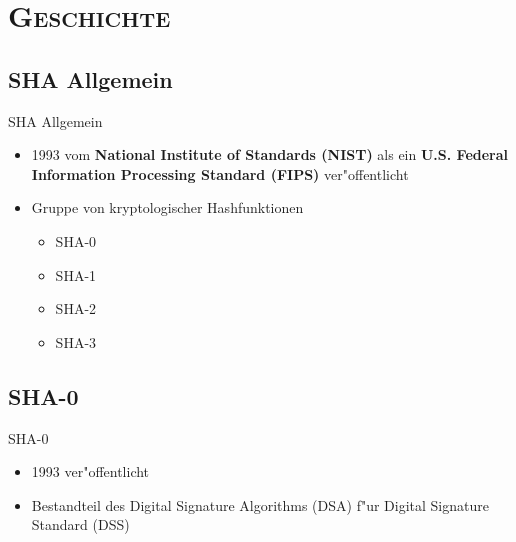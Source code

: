 \documentclass[xcolor=x11names,compress]{beamer}
\renewcommand{\(}{\begin{columns}}
\renewcommand{\)}{\end{columns}}
\newcommand{\<}[1]{\begin{column}{#1}}
\renewcommand{\>}{\end{column}}
\begin{document}

\section{\scshape Geschichte}
\subsection{SHA Allgemein}
\begin{frame}{SHA Allgemein}
\begin{itemize}


\item 1993 vom {\bf National Institute of Standards (NIST)} 
als ein {\bf U.S. Federal Information Processing Standard (FIPS)} 
ver"offentlicht

	\pause
{}
\item Gruppe von kryptologischer Hashfunktionen
	\begin{itemize}
		\item SHA-0	
		\item SHA-1
		\item SHA-2
		\item SHA-3
	\end{itemize}

\end{itemize}
\end{frame}

\subsection{SHA-0}
\begin{frame}{SHA-0}
\begin{itemize}
\item 1993 ver"offentlicht
	\pause
{}
\item Bestandteil des Digital Signature Algorithms (DSA) f"ur Digital Signature Standard (DSS)

\end{itemize}
\end{frame}
\end{document}
